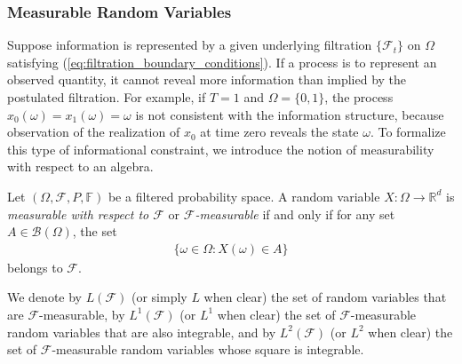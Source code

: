 \documentclass[\topdir/lecture\_notes.tex]{subfiles}
\begin{document}



\subsubsection*{Measurable Random Variables}
Suppose information is represented by a given underlying filtration $\{\mathcal{F}_{t}\}$ on $\Omega$ satisfying (\ref{eq:filtration_boundary_conditions}). If a process is to represent an observed quantity, it cannot reveal more information than implied by the postulated filtration. For example, if $T=1$ and $\Omega=\{0,1\}$, the process $x_{0}(\omega)=x_{1}(\omega)=\omega$ is not consistent with the information structure, because observation of the realization of $x_{0}$ at time zero reveals the state $\omega$. To formalize this type of informational constraint, we introduce the notion of measurability with respect to an algebra.

\begin{defn}
Let $(\Omega, \mathcal{F}, P, \mathbb{F})$ be a filtered probability space. A random variable $X: \Omega \rightarrow \mathbb{R}^{d}$ is \emph{measurable with respect to $\mathcal{F}$} or \emph{$\mathcal{F}$-measurable} if and only if for any set $A\in \mathcal{B}(\Omega)$, the set
\begin{align*}
\{\omega \in \Omega: X(\omega) \in A\}
\end{align*}
belongs to $\mathcal{F}$.
\end{defn}

We denote by $L(\mathcal{F})$ (or simply $L$ when clear) the set of random variables that are $\mathcal{F}$-measurable, by $L^{1}(\mathcal{F})$ (or $L^{1}$ when clear) the set of $\mathcal{F}$-measurable random variables that are also integrable, and by $L^{2}(\mathcal{F})$ (or $L^{2}$ when clear) the set of $\mathcal{F}$-measurable random variables whose square is integrable.
\end{document}
